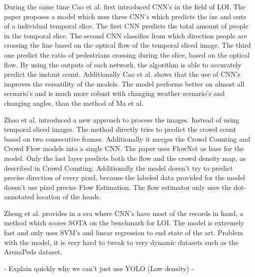 During the same time Cao et al. \cite{cao_large_2015} first introduced CNN's in the field of LOI. The paper proposes a model which uses three CNN's which predicts the ins and outs of a individual temporal slice. The first CNN predicts the total amount of people in the temporal slice. The second CNN classifies from which direction people are crossing the line based on the optical flow of the temporal sliced image. The third one predict the ratio of pedestrians crossing during the slice, based on the optical flow. By using the outputs of each network, the algorithm is able to accurately predict the instant count. Additionally Cao et al. \cite{cao_large_2015} shows that the use of CNN's improves the versatility of the models. The model performs better on almost all scenario's and is much more robust with changing weather scenario's and changing angles, than the method of Ma et al. \cite{ma_counting_2016}

Zhao et al. \cite{leibe_crossing-line_2016} introduced a new approach to process the images. Instead of using temporal sliced images. The method directly tries to predict the crowd count based on two consecutive frames. Additionally it merges the Crowd Counting and Crowd Flow models into a single CNN. The paper uses FlowNet as base for the model. Only the last layer predicts both the flow and the crowd density map, as described in Crowd Counting. Additionally the model doesn't try to predict precise direction of every pixel, because the labeled data provided for the model doesn't use pixel precise Flow Estimation. The flow estimator only uses the dot-annotated location of the heads.

Zheng et al. \cite{zheng_cross-line_2019} provides in a era where CNN's have most of the records in hand, a method which scores SOTA on the benchmark for LOI. The model is extremely fast and only uses SVM's and linear regression to end state of the art. Problem with the model, it is very hard to tweak to very dynamic datasets such as the ArenaPeds dataset.



- Explain quickly why we can't just use YOLO (Low density)
-